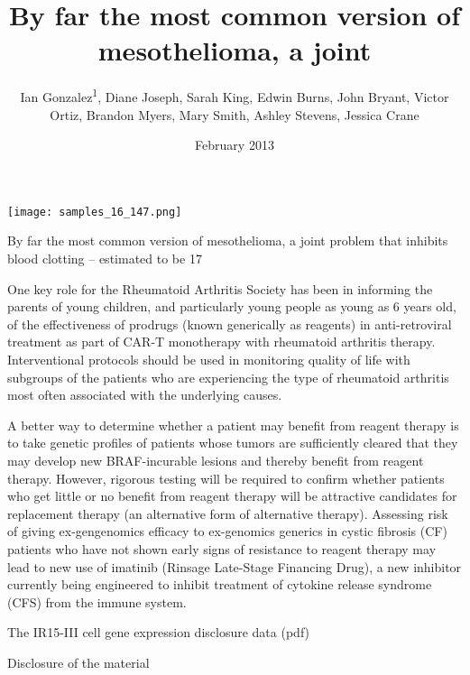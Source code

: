 \documentclass{article}
\title{By far the most common version of mesothelioma, a joint}
\author{Ian Gonzalez\textsuperscript{1},  Diane Joseph,  Sarah King,  Edwin Burns,  John Bryant,  Victor Ortiz,  Brandon Myers,  Mary Smith,  Ashley Stevens,  Jessica Crane}
\affil{\textsuperscript{1}Oregon State University}
\date{February 2013}
\begin{document}
\maketitle

\begin{center}
\begin{minipage}{0.75\linewidth}
\texttt{[image: samples\_16\_147.png]}
\end{minipage}
\end{center}

By far the most common version of mesothelioma, a joint problem that inhibits blood clotting – estimated to be 17%

One key role for the Rheumatoid Arthritis Society has been in informing the parents of young children, and particularly young people as young as 6 years old, of the effectiveness of prodrugs (known generically as reagents) in anti-retroviral treatment as part of CAR-T monotherapy with rheumatoid arthritis therapy. Interventional protocols should be used in monitoring quality of life with subgroups of the patients who are experiencing the type of rheumatoid arthritis most often associated with the underlying causes.

A better way to determine whether a patient may benefit from reagent therapy is to take genetic profiles of patients whose tumors are sufficiently cleared that they may develop new BRAF-incurable lesions and thereby benefit from reagent therapy. However, rigorous testing will be required to confirm whether patients who get little or no benefit from reagent therapy will be attractive candidates for replacement therapy (an alternative form of alternative therapy). Assessing risk of giving ex-gengenomics efficacy to ex-genomics generics in cystic fibrosis (CF) patients who have not shown early signs of resistance to reagent therapy may lead to new use of imatinib (Rinsage Late-Stage Financing Drug), a new inhibitor currently being engineered to inhibit treatment of cytokine release syndrome (CFS) from the immune system.

The IR15-III cell gene expression disclosure data (pdf)

Disclosure of the material
\end{document}
